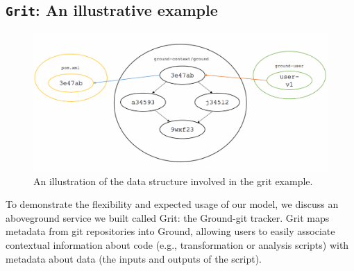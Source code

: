 \documentclass{sig-alternate}
\begin{document}


\subsection{\texttt{Grit}: An illustrative example}
\begin{figure}[th]
\centering
\includegraphics[width=0.75\linewidth]{grit.pdf}
\caption{An illustration of the data structure involved in the grit example. }
\label{fig:grit}
\end{figure}

To demonstrate the flexibility and expected usage of our model, we discuss an aboveground service we built called Grit: the Ground-git tracker. Grit maps metadata from git repositories into Ground, allowing users to easily associate contextual information about code (e.g., transformation or analysis scripts) with metadata about data (the inputs and outputs of the script).
\end{document}
